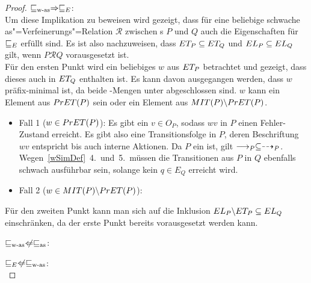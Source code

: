 \begin{proof}
  $\sqsubseteq _{\mathrm{w}\text{-}\mathrm{as}} \Rightarrow  \sqsubseteq  _E$:\\
  Um diese Implikation zu beweisen wird gezeigt, dass für eine beliebige
  schwache as"=Verfeinerungs"=Relation $\mathcal{R}$ zwischen \MEIO{}s $P$ und
  $Q$ auch die Eigenschaften für $ \sqsubseteq  _E$ erfüllt sind. Es ist also
  nachzuweisen, dass $ET _P \subseteq ET _Q$ und $EL _P \subseteq EL _Q$
  gilt, wenn $P\mathcal{R}Q$ vorausgesetzt ist.\\
  Für den ersten Punkt wird ein beliebiges $w$ aus $ET _P$ betrachtet und
  gezeigt, dass dieses auch in $ET _Q$ enthalten ist. Es kann davon
  ausgegangen werden, dass $w$ präfix-minimal ist, da beide \ET{}-Mengen unter
  \cont{} abgeschlossen sind. $w$ kann ein Element aus $PrET (P)$ sein oder
  ein Element aus $MIT (P)\backslash PrET (P)$.
  \begin{itemize}
    \item Fall 1 ($w\in PrET (P)$): Es gibt ein $v\in O_P$, sodass $wv$ in $P$
      einen Fehler-Zustand erreicht. Es gibt also eine Transitionsfolge in $P$,
      deren Beschriftung $wv$ entspricht bis auch interne Aktionen. Da $P$ ein
      \MEIO{} ist, gilt $\must _P\subseteq\may _P$. Wegen~\ref{wSimDef}~4.\
      und~5.\ müssen die Transitionen aus $P$ in $Q$ ebenfalls schwach
      ausführbar sein, solange kein $q\in E_Q$ erreicht wird. \TODO{fertig
      beweisen}
    \item Fall 2 ($w\in MIT (P)\backslash PrET (P)$): 
  \end{itemize}
  Für den zweiten Punkt kann man sich auf die Inklusion $EL _P\backslash ET _P
  \subseteq EL _Q$ einschränken, da der erste Punkt bereits vorausgesetzt
  werden kann.

  $\wasRel \hspace{0.1cm}\not\hspace{-0.1cm}\Leftarrow \asRel$:\\

  $\ERel \hspace{0.1cm}\not\hspace{-0.1cm}\Leftarrow \wasRel$:\\
  \TODO{zu beweisen}
\end{proof}
